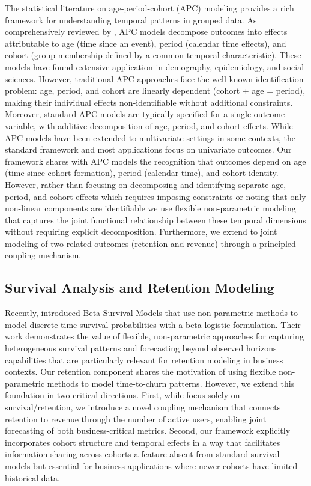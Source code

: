 \documentclass[11pt]{amsart}
\theoremstyle{definition}
\begin{document}
The statistical literature on age-period-cohort (APC) modeling provides a rich
framework for understanding temporal patterns in grouped data. As comprehensively reviewed by \cite{fannon2018apc}, APC models
decompose outcomes into effects attributable to age (time since an event), period (calendar time effects), and cohort (group
membership defined by a common temporal characteristic). These models have found extensive application in demography,
epidemiology, and social sciences. However, traditional APC approaches face the well-known identification problem: age, period,
and cohort are linearly dependent (cohort + age = period), making their individual effects non-identifiable without additional
constraints. Moreover, standard APC models are typically specified for a single outcome variable, with additive decomposition
of age, period, and cohort effects. While APC models have been extended to multivariate settings in some contexts, the standard
framework and most applications focus on univariate outcomes. Our framework shares with APC models the recognition that outcomes
depend on age (time since cohort formation), period (calendar time), and cohort identity. However, rather than focusing on
decomposing and identifying separate age, period, and cohort effects which requires imposing constraints or noting that only
non-linear components are identifiable we use flexible non-parametric modeling that captures the joint functional
relationship between these temporal dimensions without requiring explicit decomposition. Furthermore, we extend to joint
modeling of two related outcomes (retention and revenue) through a principled coupling mechanism.

\subsection{Survival Analysis and Retention Modeling}

Recently, \cite{hubbard2021beta} introduced Beta Survival Models
that use non-parametric methods to model discrete-time survival probabilities with a beta-logistic formulation.
Their work demonstrates the value of flexible, non-parametric approaches for capturing heterogeneous survival patterns and
forecasting beyond observed horizons capabilities that are particularly relevant for retention modeling
in business contexts. Our retention component shares the motivation of using
flexible non-parametric methods to model time-to-churn patterns. However, we extend this foundation in
two critical directions. First, while \cite{hubbard2021beta} focus solely on survival/retention, we introduce a novel
coupling mechanism that connects retention to revenue through the number of active users, enabling joint forecasting of
both business-critical metrics. Second, our framework explicitly incorporates cohort structure and temporal effects in a
way that facilitates information sharing across cohorts a feature absent from standard survival models but essential for
business applications where newer cohorts have limited historical data.
\end{document}
